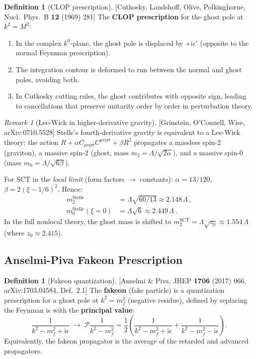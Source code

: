 \documentclass[12pt,a4paper]{article}
\theoremstyle{definition}
\newtheorem{definition}[proposition]{Definition}
\theoremstyle{remark}
\newtheorem{remark}[proposition]{Remark}
\newcommand{\Weylsq}{C_{\mu\nu\rho\sigma}C^{\mu\nu\rho\sigma}}
\newcommand{\ii}{\mathrm{i}}
\newcommand{\PP}{\mathcal{P}}
\newcommand{\fromlit}[1]{\textcolor{blue!70!black}{\textsf{[#1]}}}
\begin{document}
\begin{definition}[CLOP prescription]
\label{def:clop}
\fromlit{Cutkosky, Landshoff, Olive, Polkinghorne, Nucl.\ Phys.\ B
\textbf{12} (1969) 281}
The \textbf{CLOP prescription} for the ghost pole at $k^2 = M^2$:
\begin{enumerate}[nosep,label=(\roman*)]
  \item In the complex $k^0$-plane, the ghost pole is displaced by
    $+\ii\epsilon'$ (opposite to the normal Feynman prescription).
  \item The integration contour is deformed to run between the normal
    and ghost poles, avoiding both.
  \item In Cutkosky cutting rules, the ghost contributes with opposite
    sign, leading to cancellations that preserve unitarity order by
    order in perturbation theory.
\end{enumerate}
\end{definition}

\begin{remark}[Lee-Wick in higher-derivative gravity]
\label{rem:lw-gravity}
\fromlit{Grinstein, O'Connell, Wise, arXiv:0710.5528}
Stelle's fourth-derivative gravity is equivalent to a Lee-Wick theory:
the action $R + \alpha\Weylsq + \beta R^2$ propagates a massless
spin-2 (graviton), a massive spin-2 (ghost, mass
$m_2 = \Lambda/\sqrt{2\alpha}$), and a massive spin-0
(mass $m_0 = \Lambda/\sqrt{6\beta}$).

For SCT in the \emph{local limit} (form factors $\to$ constants):
$\alpha = 13/120$, $\beta = 2(\xi-1/6)^2$.  Hence:
\begin{align}
  m_2^{\mathrm{Stelle}} &= \Lambda\sqrt{60/13} \approx 2.148\,\Lambda\,,\\
  m_0^{\mathrm{Stelle}}(\xi=0) &= \Lambda\sqrt{6} \approx 2.449\,\Lambda\,.
\end{align}
In the full nonlocal theory, the ghost mass is shifted to
$m_2^{\mathrm{SCT}} = \Lambda\sqrt{z_0} \approx 1.554\,\Lambda$
(where $z_0 \approx 2.415$).
\end{remark}


\subsection{Anselmi-Piva Fakeon Prescription}

\begin{definition}[Fakeon quantization]
\label{def:fakeon}
\fromlit{Anselmi \& Piva, JHEP \textbf{1706} (2017) 066,
arXiv:1703.04584, Def.~2.1}
The \textbf{fakeon} (fake particle) is a quantization prescription for
a ghost pole at $k^2 = m_f^2$ (negative residue), defined by replacing
the Feynman $\ii\epsilon$ with the \textbf{principal value}:
\begin{equation}\label{eq:fakeon-pv}
  \frac{1}{k^2 - m_f^2 + \ii\epsilon}
  \;\longrightarrow\;
  \PP\frac{1}{k^2 - m_f^2}
  = \frac{1}{2}\left(
    \frac{1}{k^2 - m_f^2 + \ii\epsilon}
    + \frac{1}{k^2 - m_f^2 - \ii\epsilon}
  \right).
\end{equation}
Equivalently, the fakeon propagator is the average of the retarded and
advanced propagators.
\end{definition}
\end{document}
